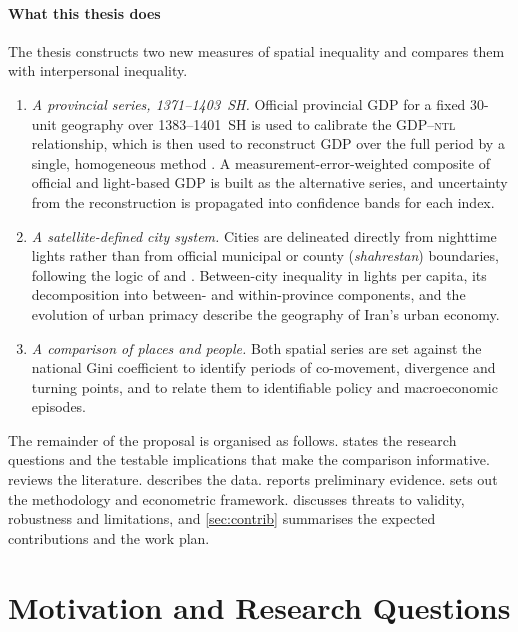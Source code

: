 \documentclass[11pt,a4paper]{article}
\newcommand{\NTL}{\textsc{ntl}}
\begin{document}
\paragraph{What this thesis does}
The thesis constructs two new measures of spatial inequality and compares them with interpersonal inequality.
\begin{enumerate}[label=(\roman*)]
\item \emph{A provincial series, 1371--1403~SH.} Official provincial GDP for a fixed 30-unit geography over 1383--1401~SH is used to calibrate the GDP--\NTL{} relationship, which is then used to reconstruct GDP over the full period by a single, homogeneous method \citep{LessmannSeidel2017}. A measurement-error-weighted composite of official and light-based GDP is built as the alternative series, and uncertainty from the reconstruction is propagated into confidence bands for each index.
\item \emph{A satellite-defined city system.} Cities are delineated directly from nighttime lights rather than from official municipal or county (\emph{shahrestan}) boundaries, following the logic of \citet{Dingel2021} and \citet{Harari2020}. Between-city inequality in lights per capita, its decomposition into between- and within-province components, and the evolution of urban primacy describe the geography of Iran's urban economy.
\item \emph{A comparison of places and people.} Both spatial series are set against the national Gini coefficient to identify periods of co-movement, divergence and turning points, and to relate them to identifiable policy and macroeconomic episodes.
\end{enumerate}

The remainder of the proposal is organised as follows.  states the research questions and the testable implications that make the comparison informative.  reviews the literature.  describes the data.  reports preliminary evidence.  sets out the methodology and econometric framework.  discusses threats to validity, robustness and limitations, and \cref{sec:contrib} summarises the expected contributions and the work plan.

\section{Motivation and Research Questions}\label{sec:rq}
\end{document}
